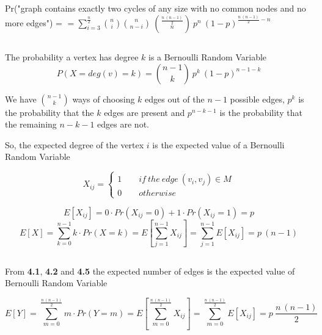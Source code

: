 \documentclass[11pt]{article}
\begin{document}
\bigskip
\noindent
Pr("graph contains exactly two cycles of any size with no common nodes and no more edges") = \newline
$ = \displaystyle \sum_{i=3}^{\frac{n}{2}} \binom{n}{i} \binom{n}{n-i}\ \binom{\frac{n \ (n-1)}{2}}{n} \ p^n \ (1-p)^{\frac{n \ (n-1)}{2} - n} $


\subsection{}
The probability a vertex has degree $k$ is a Bernoulli Random Variable
$$P(X = deg(v) = k) = \binom{n-1}{k} \ p^k \ (1-p)^{n-1-k} $$

\bigskip
We have $ \displaystyle \binom{n-1}{k}$ ways of choosing $k$ edges out of the $n-1$ possible edges,
$p^k$ is the probability that the $k$ edges are present and
$p^{n-k-1}$ is the probability that the remaining $n-k-1$ edges are not.

\bigskip
So, the expected degree of the vertex $i$ is the expected value of a Bernoulli Random Variable \newline

\begin{equation}
    \label{X_ij}
    X_{ij} =
    \begin{cases}
      1 \qquad if \ the \ edge \ (v_i,v_j) \in M \\
      0 \qquad otherwise
    \end{cases}
\end{equation}

$$ E[X_{ij}] = 0 \cdot Pr(X_{ij} = 0) + 1 \cdot Pr(X_{ij} = 1) = p $$
$$ E[X] = \sum_{k=0}^{n-1} k \cdot Pr(X=k) = E[\sum_{j=1}^{n-1} X_{ij}] = \sum_{j=1}^{n-1} E[X_{ij}] = p \ (n-1) $$


\subsection{}
From \textbf{4.1}, \textbf{4.2} and \textbf{4.5} the expected number of edges is the expected value of Bernoulli Random Variable

\bigskip
\noindent
$$E[Y] = \sum_{m=0}^{\frac{n \ (n-1)}{2}} m \cdot Pr(Y=m) = E[\sum_{m=0}^{\frac{n \ (n-1)}{2}} X_{ij}] = \sum_{m=0}^{\frac{n \ (n-1)}{2}} E[X_{ij}] =
p \ \frac{n \ (n-1)}{2} $$


\subsection{}
\end{document}
